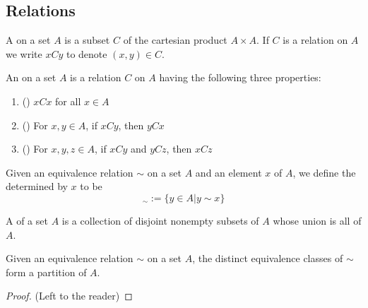 \documentclass[12pt, a4paper, oneside, openright, titlepage]{book}
\begin{document}
\begin{appendices}
	\section{Relations}
    
    \begin{definition}[Relation]
        A  on a set $A$ is a subset $C$ of the cartesian product $A \times A$. If $C$ is a relation on $A$ we write $xCy$ to denote $(x,y) \in C$.
    \end{definition}
    

    \begin{definition}
        An  on a set $A$ is a relation $C$ on $A$ having the following three properties: \begin{enumerate}
            \item () $xCx$ for all $x \in A$
            \item () For $x,y \in A$, if $xCy$, then $yCx$
            \item () For $x,y,z \in A$, if $xCy$ and $yCz$, then $xCz$
        \end{enumerate}
    \end{definition}


    \begin{definition}
        Given an equivalence relation $\sim$ on a set $A$ and an element $x$ of $A$, we define the  determined by $x$ to be \begin{equation}
            [x]_{\sim} := \{y \in A\vert y\sim x\}
        \end{equation}
    \end{definition}


    \begin{definition}[Partition]
        A  of a set $A$ is a collection of disjoint nonempty subsets of $A$ whose union is all of $A$.
    \end{definition}



    \begin{proposition}
        Given an equivalence relation $\sim$ on a set $A$, the distinct equivalence classes of $\sim$ form a partition of $A$.
    \end{proposition}
    \begin{proof}
        (Left to the reader)
    \end{proof}


\end{appendices}
\end{document}
